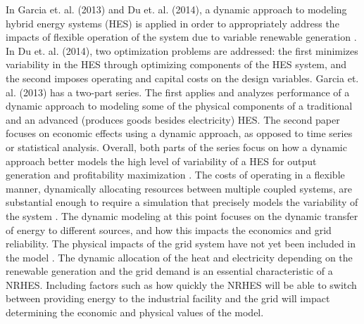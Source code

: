 \documentclass{article}                                                                           %
\begin{document}
\begin{linenumbers}
In Garcia et. al. (2013) and Du et. al. (2014), a dynamic approach to modeling hybrid energy systems (HES) is applied in order to appropriately address the impacts of flexible operation of the system due to variable renewable generation \cite{Garcia2013, Du2014}. In Du et. al. (2014), two optimization problems are addressed: the first minimizes variability in the HES through optimizing components of the HES system, and the second imposes operating and capital costs on the design variables. Garcia et. al. (2013) has a two-part series. The first applies and analyzes performance of a dynamic approach to modeling some of the physical components of a traditional and an advanced (produces goods besides electricity) HES. The second paper focuses on economic effects using a dynamic approach, as opposed to time series or statistical analysis. Overall, both parts of the series focus on how a dynamic approach better models the high level of variability of a HES for output generation and profitability maximization \cite{Garcia2013}. The costs of operating in a flexible manner, dynamically allocating resources between multiple coupled systems, are substantial enough to require a simulation that precisely models the variability of the system \cite{Garcia2013, Shropshire2011, Locatelli2015}. The dynamic modeling at this point focuses on the dynamic transfer of energy to different sources, and how this impacts the economics and grid reliability. The physical impacts of the grid system have not yet been included in the model \cite{Harrison2016}.  The dynamic allocation of the heat and electricity depending on the renewable generation and the grid demand is an essential characteristic of a NRHES.  Including factors such as how quickly the NRHES will be able to switch between providing energy to the industrial facility and the grid will impact determining the economic and physical values of the model.





\end{linenumbers}
\end{document}

